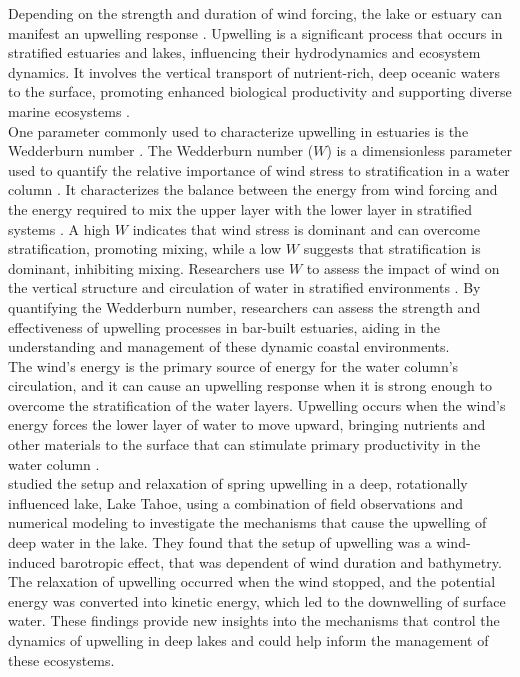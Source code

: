 \documentclass[tesis.tex]{subfiles}
\begin{document}
Depending on the strength and duration of wind forcing, the lake or estuary can manifest an upwelling response \citep{Shintani2010}. Upwelling is a significant process that occurs in stratified estuaries and lakes, influencing their hydrodynamics and ecosystem dynamics. It involves the vertical transport of nutrient-rich, deep oceanic waters to the surface, promoting enhanced biological productivity and supporting diverse marine ecosystems \citep{gupta2022nutrient}.\\

One parameter commonly used to characterize upwelling in estuaries is the Wedderburn number \citep{Imberger1982}. The Wedderburn number ($W$) is a dimensionless parameter used to quantify the relative importance of wind stress to stratification in a water column \citep{patterson1984classification}. It characterizes the balance between the energy from wind forcing and the energy required to mix the upper layer with the lower layer in stratified systems \citep{monismith2006turbulent}. A high $W$ indicates that wind stress is dominant and can overcome stratification, promoting mixing, while a low $W$ suggests that stratification is dominant, inhibiting mixing. Researchers use $W$ to assess the impact of wind on the vertical structure and circulation of water in stratified environments \citep{de2008evolution,Wuest2003}. By quantifying the Wedderburn number, researchers can assess the strength and effectiveness of upwelling processes in bar-built estuaries, aiding in the understanding and management of these dynamic coastal environments.\\

The wind's energy is the primary source of energy for the water column's circulation, and it can cause an upwelling response when it is strong enough to overcome the stratification of the water layers. Upwelling occurs when the wind's energy forces the lower layer of water to move upward, bringing nutrients and other materials to the surface that can stimulate primary productivity in the water column \citep{macintyre2010ecosystem}. \\


\cite{roberts2021setup} studied the setup and relaxation of spring upwelling in a deep, rotationally influenced lake, Lake Tahoe, using a combination of field observations and numerical modeling to investigate the mechanisms that cause the upwelling of deep water in the lake. They found that the setup of upwelling was a wind-induced barotropic effect, that was dependent of wind duration and bathymetry. The relaxation of upwelling occurred when the wind stopped, and the potential energy was converted into kinetic energy, which led to the downwelling of surface water. These findings provide new insights into the mechanisms that control the dynamics of upwelling in deep lakes and could help inform the management of these ecosystems.\\
\end{document}
